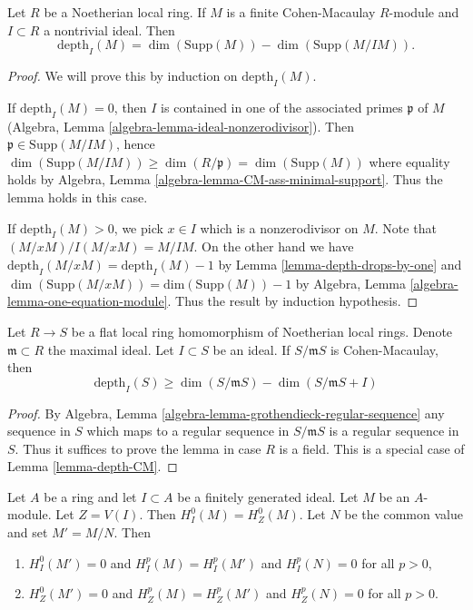 \begin{lemma}
\label{lemma-depth-CM}
Let $R$ be a Noetherian local ring. If $M$ is a finite Cohen-Macaulay
$R$-module and $I \subset R$ a nontrivial ideal. Then
$$
\text{depth}_I(M) = \dim(\text{Supp}(M)) - \dim(\text{Supp}(M/IM)).
$$
\end{lemma}

\begin{proof}
We will prove this by induction on $\text{depth}_I(M)$.

\medskip\noindent
If $\text{depth}_I(M) = 0$, then $I$ is contained in one
of the associated primes $\mathfrak p$ of $M$
(Algebra, Lemma \ref{algebra-lemma-ideal-nonzerodivisor}).
Then $\mathfrak p \in \text{Supp}(M/IM)$, hence
$\dim(\text{Supp}(M/IM)) \geq \dim(R/\mathfrak p) = \dim(\text{Supp}(M))$
where equality holds by
Algebra, Lemma \ref{algebra-lemma-CM-ass-minimal-support}.
Thus the lemma holds in this case.

\medskip\noindent
If $\text{depth}_I(M) > 0$, we pick $x \in I$ which is a
nonzerodivisor on $M$. Note that $(M/xM)/I(M/xM) = M/IM$.
On the other hand we have
$\text{depth}_I(M/xM) = \text{depth}_I(M) - 1$
by Lemma \ref{lemma-depth-drops-by-one}
and $\dim(\text{Supp}(M/xM)) = \text{dim}(\text{Supp}(M)) -  1$
by Algebra, Lemma \ref{algebra-lemma-one-equation-module}.
Thus the result by induction hypothesis.
\end{proof}

\begin{lemma}
\label{lemma-depth-flat-CM}
Let $R \to S$ be a flat local ring homomorphism of Noetherian local
rings. Denote $\mathfrak m \subset R$ the maximal ideal.
Let $I \subset S$ be an ideal.
If $S/\mathfrak mS$ is Cohen-Macaulay, then
$$
\text{depth}_I(S) \geq \dim(S/\mathfrak mS) - \dim(S/\mathfrak mS + I)
$$
\end{lemma}

\begin{proof}
By Algebra, Lemma \ref{algebra-lemma-grothendieck-regular-sequence}
any sequence in $S$ which maps to a regular sequence in $S/\mathfrak mS$
is a regular sequence in $S$. Thus it suffices to prove the lemma
in case $R$ is a field. This is a special case of Lemma \ref{lemma-depth-CM}.
\end{proof}

\begin{lemma}
\label{lemma-divide-by-torsion}
Let $A$ be a ring and let $I \subset A$ be a finitely generated ideal.
Let $M$ be an $A$-module. Let $Z = V(I)$.
Then $H^0_I(M) = H^0_Z(M)$. Let $N$ be the common value and
set $M' = M/N$. Then
\begin{enumerate}
\item $H^0_I(M') = 0$ and $H^p_I(M) = H^p_I(M')$ and $H^p_I(N) = 0$
for all $p > 0$,
\item $H^0_Z(M') = 0$ and $H^p_Z(M) = H^p_Z(M')$ and $H^p_Z(N) = 0$
for all $p > 0$.
\end{enumerate}
\end{lemma}


